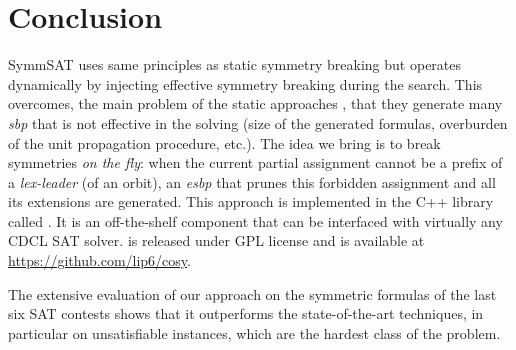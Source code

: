 \section{Conclusion}
SymmSAT uses same principles as static symmetry breaking but operates dynamically by 
injecting effective symmetry breaking during the search.
This overcomes, the main problem of the static approaches , that they
generate many \textit{sbp} that is not effective in the solving (size of the
generated formulas, overburden of the unit propagation procedure, etc.).
The idea we bring is to break symmetries \emph{on the fly}: when the current
partial assignment cannot be a prefix of a \textit{lex-leader} (of an orbit),
an \textit{esbp} that prunes this forbidden assignment and all its extensions are generated. 
This approach is implemented in the C++ library called \libdsb{}. It is an
off-the-shelf component that can be interfaced with virtually any CDCL SAT
solver. \libdsb{} is released under GPL license and is available at
\url{https://github.com/lip6/cosy}.
 
The extensive evaluation of our approach on the symmetric formulas of the last
six SAT contests shows that it outperforms the state-of-the-art techniques, in
particular on unsatisfiable instances, which are the hardest class of the
problem.